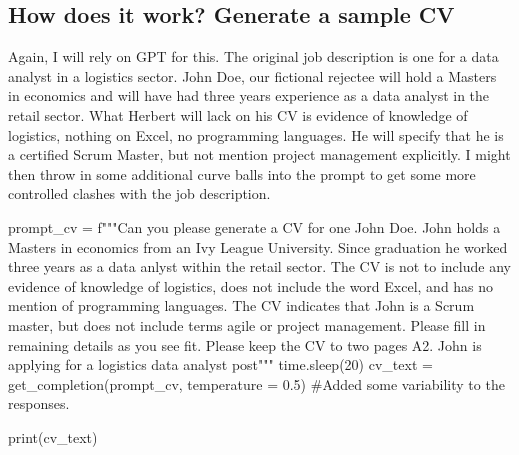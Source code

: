 \documentclass[
  letterpaper,
  DIV=11,
  numbers=noendperiod]{scrartcl}
\newenvironment{Shaded}{\begin{snugshade}}{\end{snugshade}}
\newcommand{\BuiltInTok}[1]{\textcolor[rgb]{0.00,0.23,0.31}{#1}}
\newcommand{\CommentTok}[1]{\textcolor[rgb]{0.37,0.37,0.37}{#1}}
\newcommand{\DecValTok}[1]{\textcolor[rgb]{0.68,0.00,0.00}{#1}}
\newcommand{\FloatTok}[1]{\textcolor[rgb]{0.68,0.00,0.00}{#1}}
\newcommand{\NormalTok}[1]{\textcolor[rgb]{0.00,0.23,0.31}{#1}}
\newcommand{\OperatorTok}[1]{\textcolor[rgb]{0.37,0.37,0.37}{#1}}
\newcommand{\SpecialStringTok}[1]{\textcolor[rgb]{0.13,0.47,0.30}{#1}}
\begin{document}
\hypertarget{how-does-it-work-generate-a-sample-cv}{%
\subsection{How does it work? Generate a sample
CV}\label{how-does-it-work-generate-a-sample-cv}}

Again, I will rely on GPT for this. The original job description is one
for a data analyst in a logistics sector. John Doe, our fictional
rejectee will hold a Masters in economics and will have had three years
experience as a data analyst in the retail sector. What Herbert will
lack on his CV is evidence of knowledge of logistics, nothing on Excel,
no programming languages. He will specify that he is a certified Scrum
Master, but not mention project management explicitly. I might then
throw in some additional curve balls into the prompt to get some more
controlled clashes with the job description.

\begin{Shaded}
\begin{Highlighting}[]
\NormalTok{prompt\_cv }\OperatorTok{=} \SpecialStringTok{f"""Can you please generate a CV for one John Doe. John holds a Masters in economics from an Ivy League University. Since graduation he worked three years as a data anlyst within the retail sector. The CV is not to include any evidence of knowledge of logistics, does not include the word \textquotesingle{}Excel\textquotesingle{}, and has no mention of programming languages. The CV indicates that John is a Scrum master, but does not include terms \textquotesingle{}agile\textquotesingle{} or \textquotesingle{}project management\textquotesingle{}. Please fill in remaining details as you see fit. Please keep the CV to two pages A2. John is applying for a logistics data analyst post"""}
\NormalTok{time.sleep(}\DecValTok{20}\NormalTok{)}
\NormalTok{cv\_text }\OperatorTok{=}\NormalTok{ get\_completion(prompt\_cv, temperature }\OperatorTok{=} \FloatTok{0.5}\NormalTok{) }\CommentTok{\#Added some variability to the responses.}

\BuiltInTok{print}\NormalTok{(cv\_text)}
\end{Highlighting}
\end{Shaded}
\end{document}
